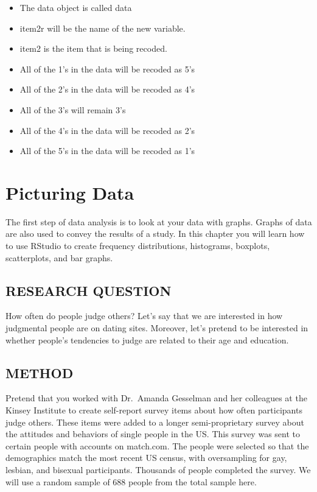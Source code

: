 \documentclass[
]{book}
\providecommand{\tightlist}{%
  \setlength{\itemsep}{0pt}\setlength{\parskip}{0pt}}
\begin{document}
\begin{itemize}
\tightlist
\item
  The data object is called data\\
\item
  item2r will be the name of the new variable.\\
\item
  item2 is the item that is being recoded.\\
\item
  All of the 1's in the data will be recoded as 5's\\
\item
  All of the 2's in the data will be recoded as 4's\\
\item
  All of the 3's will remain 3's\\
\item
  All of the 4's in the data will be recoded as 2's\\
\item
  All of the 5's in the data will be recoded as 1's
\end{itemize}

\hypertarget{picturing-data}{%
\chapter{Picturing Data}\label{picturing-data}}

The first step of data analysis is to look at your data with graphs. Graphs of data are also used to convey the results of a study. In this chapter you will learn how to use RStudio to create frequency distributions, histograms, boxplots, scatterplots, and bar graphs.

\hypertarget{research-question}{%
\section{RESEARCH QUESTION}\label{research-question}}

How often do people judge others? Let's say that we are interested in how judgmental people are on dating sites. Moreover, let's pretend to be interested in whether people's tendencies to judge are related to their age and education.

\hypertarget{method}{%
\section{METHOD}\label{method}}

Pretend that you worked with Dr.~Amanda Gesselman and her colleagues at the Kinsey Institute to create self-report survey items about how often participants judge others. These items were added to a longer semi-proprietary survey about the attitudes and behaviors of single people in the US. This survey was sent to certain people with accounts on match.com. The people were selected so that the demographics match the most recent US census, with oversampling for gay, lesbian, and bisexual participants. Thousands of people completed the survey. We will use a random sample of 688 people from the total sample here.
\end{document}
